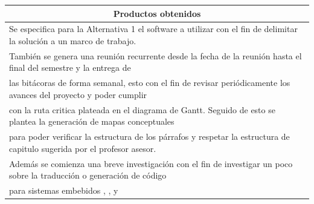 \documentclass[12pt,letterpaper]{article}
\begin{document}
\begin{table}[h!]
{\begin{tabular}{|l|}
          \multicolumn{1}{|c|}{Productos obtenidos}                            \\ \hline\hline
          Se especifica para la Alternativa 1 el software a utilizar con el fin de delimitar la solución a un marco de trabajo.\\ 
          También se genera una reunión recurrente desde la fecha de la reunión hasta el final del semestre y la entrega de \\
          las bitácoras de forma semanal, esto con el fin de revisar periódicamente los avances del proyecto y poder cumplir \\
          con la ruta critica plateada en el diagrama de Gantt. Seguido de esto se plantea la generación de mapas conceptuales \\
          para poder verificar la estructura de los párrafos y respetar la estructura de capitulo sugerida por el profesor asesor. \\
          Además se comienza una breve investigación con el fin de investigar un poco sobre la traducción o generación de código \\
          para sistemas embebidos \cite{mathworks_code_generation}, \cite{suarez2018metodologias}, \cite{galeano2009programacion} y \cite{osio2007optimizacion} \\
          \hline
          \end{tabular}
            }
          \end{table}



\end{document}
